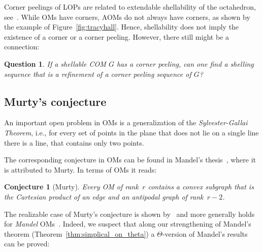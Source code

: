 \documentclass[final,11pt]{article}
\newtheorem{quest}{Question}
\newtheorem{conj}{Conjecture}%
\newcommand{\comment}[1]{\textcolor{red}{#1}}
\begin{document}


Corner peelings of LOPs are related to extendable shellability of the octahedron, see~\cite{Tra-04,Cha-18}. 
While OMs have corners, AOMs do not always have corners, as shown by the example of Figure~\ref{fig:tracyhall}. Hence, shellability does not imply the existence of a corner or a corner peeling. However, there still might be a connection:

\begin{quest}
 If a shellable COM $G$ has a corner peeling, can one find a shelling sequence that is a refinement of a corner peeling sequence of $G$?
\end{quest}

% 


\subsection{Murty's conjecture}

An important open problem in OMs is a generalization of the \emph{Sylvester-Gallai Theorem}, i.e., for every set of points in the plane that does not lie on a single line there is a line, that contains only two points. 

The corresponding conjecture in OMs can be found in Mandel's thesis~\cite{Man-82}, where it is attributed to Murty. In terms of OMs it reads:

\begin{conj}[Murty]\label{conj:murty}
 Every OM of rank~$r$ contains a convex subgraph that is the Cartesian product of an edge and an antipodal graph of rank~$r-2$.
\end{conj}

The realizable case of Murty's conjecture is shown by~\cite{Sha-79} and more generally holds for \emph{Mandel} OMs~\cite{Man-82}. Indeed, we suspect that along our strengthening of Mandel's theorem (Theorem~\ref{thm:simplical_on_theta}) a $\Theta$-version of Mandel's results can be proved:
\end{document}
